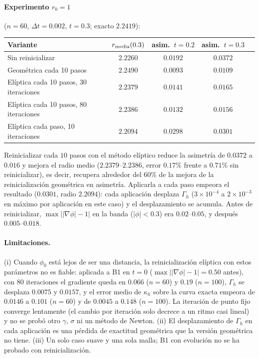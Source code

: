 \paragraph{Experimento $r_0=1$} ($n=60$, $\Delta t=0.002$, $t=0.3$; exacto $2.2419$):
\begin{center}
\begin{tabular}{lcccc}
\toprule
Variante & $r_{\rm media}(0.3)$ & asim.\ $t=0.2$ & asim.\ $t=0.3$\\
\midrule
Sin reinicializar & $2.2260$ & $0.0192$ & $0.0372$\\
Geométrica cada 10 pasos & $2.2490$ & $0.0093$ & $0.0109$\\
Elíptica cada 10 pasos, 30 iteraciones & $2.2379$ & $0.0141$ & $0.0165$\\
Elíptica cada 10 pasos, 80 iteraciones & $2.2386$ & $0.0132$ & $0.0156$\\
Elíptica cada paso, 10 iteraciones & $2.2094$ & $0.0298$ & $0.0301$\\
\bottomrule
\end{tabular}
\end{center}
Reinicializar cada $10$ pasos con el método elíptico reduce la asimetría de $0.0372$ a $0.016$ y mejora el radio medio ($2.2379$--$2.2386$, error $0.17\%$ frente a $0.71\%$ sin reinicializar), es decir, recupera alrededor del $60\%$ de la mejora de la reinicialización geométrica en asimetría. Aplicarla a cada paso empeora el resultado ($0.0301$, radio $2.2094$): cada aplicación desplaza $\Gamma_h$ ($3\times10^{-4}$ a $2\times10^{-3}$ en máximo por aplicación en este caso) y el desplazamiento se acumula. Antes de reinicializar, $\max\big||\nabla\phi|-1\big|$ en la banda ($|\phi|<0.3$) era $0.02$--$0.05$, y después $0.005$--$0.018$.

\paragraph{Limitaciones.} (i) Cuando $\phi_0$ está lejos de ser una distancia, la reinicialización elíptica con estos parámetros no es fiable: aplicada a B1 en $t=0$ ($\max\big||\nabla\phi|-1\big|=0.50$ antes), con 80 iteraciones el gradiente queda en $0.066$ ($n=60$) y $0.19$ ($n=100$), $\Gamma_h$ se desplaza $0.0075$ y $0.0157$, y el error medio de $\kappa_h$ sobre la curva exacta empeora de $0.0146$ a $0.101$ ($n=60$) y de $0.0045$ a $0.148$ ($n=100$). La iteración de punto fijo converge lentamente (el cambio por iteración solo decrece a un ritmo casi lineal) y no se probó otro $\gamma$, $\sigma$ ni un método de Newton. (ii) El desplazamiento de $\Gamma_h$ en cada aplicación es una pérdida de exactitud geométrica que la versión geométrica no tiene. (iii) Un solo caso suave y una sola malla; B1 con evolución no se ha probado con reinicialización.

